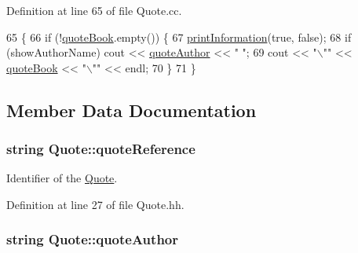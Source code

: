 Definition at line 65 of file Quote.\+cc.


\begin{DoxyCode}
65                                                        \{
66     \textcolor{keywordflow}{if} (!\hyperlink{class_quote_a7e6968e086bdd45b40627a37ecbbf6fc}{quoteBook}.empty()) \{
67         \hyperlink{class_quote_a0854af3d11ff805991e87ef6e9bebf69}{printInformation}(\textcolor{keyword}{true}, \textcolor{keyword}{false});
68         \textcolor{keywordflow}{if} (showAuthorName) cout << \hyperlink{class_quote_a930113c4ee0ae5e5506bbc1ea3e79b49}{quoteAuthor} << \textcolor{stringliteral}{" "};
69         cout << \textcolor{stringliteral}{"\(\backslash\)""} << \hyperlink{class_quote_a7e6968e086bdd45b40627a37ecbbf6fc}{quoteBook} << \textcolor{stringliteral}{"\(\backslash\)""} << endl;
70     \}
71 \}\end{DoxyCode}


\subsection{Member Data Documentation}
\subsubsection[{\texorpdfstring{quote\+Reference}{quoteReference}}]{\setlength{\rightskip}{0pt plus 5cm}string Quote\+::quote\+Reference\hspace{0.3cm}{\ttfamily [private]}}\hypertarget{class_quote_a9c7b2deff2ee9a0a216c360fe304202a}{}\label{class_quote_a9c7b2deff2ee9a0a216c360fe304202a}


Identifier of the \hyperlink{class_quote}{Quote}. 



Definition at line 27 of file Quote.\+hh.

\subsubsection[{\texorpdfstring{quote\+Author}{quoteAuthor}}]{\setlength{\rightskip}{0pt plus 5cm}string Quote\+::quote\+Author\hspace{0.3cm}{\ttfamily [private]}}\hypertarget{class_quote_a930113c4ee0ae5e5506bbc1ea3e79b49}{}\label{class_quote_a930113c4ee0ae5e5506bbc1ea3e79b49}


